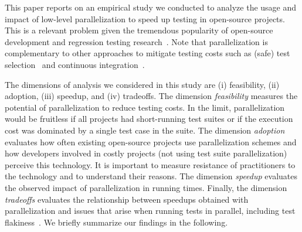 

This paper reports on an empirical study we conducted to analyze the
usage and impact of low-level parallelization to speed up testing in
open-source projects.  This is a relevant problem given the tremendous
popularity of open-source development and regression testing
research~\cite{yoo-harman-stvr2012}.  Note that parallelization is
complementary to other approaches to mitigate testing costs such as
(safe) test
selection~\cite{Rothermel:1997:SER:248233.248262,gligoric-etal-issta2015}
and continuous integration~\cite{Saff:2003:RWD:951952.952340}.

The dimensions of analysis we considered in this study are (i)
feasibility, (ii) adoption, (iii) speedup, and (iv) tradeoffs.  The
dimension \emph{feasibility} measures the potential of parallelization
to reduce testing costs.  In the limit, parallelization would be
fruitless if all projects had short-running test suites or if the
execution cost was dominated by a single test case in the suite.  The
dimension \emph{adoption} evaluates how often existing open-source
projects use parallelization schemes and how developers involved in
costly projects (not using test suite parallelization) perceive this
technology.  It is important to measure resistance of practitioners to
the technology and to understand their reasons.  The dimension
\emph{speedup} evaluates the observed impact of
parallelization in running times.  Finally, the dimension
\emph{tradeoffs} evaluates the relationship between speedups obtained
with parallelization and issues that arise 
when running tests in parallel, including test
flakiness~\cite{luo-etal-fse2014,bell-etal-esecfse2015}.  We briefly summarize our findings
in the following.

